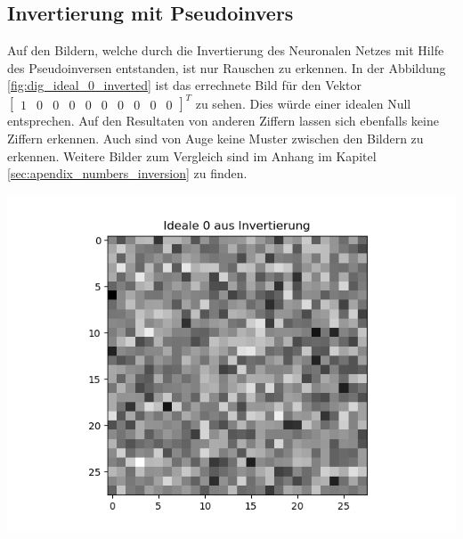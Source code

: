 \documentclass[Interploate_hadwritten_Digits.tex]{subfiles}
\begin{document}
	\subsection{Invertierung mit Pseudoinvers}
	Auf den Bildern, welche durch die Invertierung des Neuronalen Netzes mit Hilfe des Pseudoinversen entstanden, ist nur Rauschen zu erkennen. In der Abbildung \ref{fig:dig_ideal_0_inverted} ist das errechnete Bild für den Vektor $ \begin{bmatrix}1 & 0 & 0 & 0 & 0 & 0 & 0 & 0 & 0 & 0 \end{bmatrix}^{T} $ zu sehen. Dies würde einer idealen Null entsprechen. Auf den Resultaten von anderen Ziffern lassen sich ebenfalls keine Ziffern erkennen. Auch sind von Auge keine Muster zwischen den Bildern zu erkennen. Weitere Bilder zum Vergleich sind im Anhang im Kapitel \ref{sec:apendix_numbers_inversion} zu finden.
	\begin{Figure}
		\centering
		\includegraphics[width=\linewidth]{img/results/ideal_0_inverted.png}
		\label{fig:dig_ideal_0_inverted}
	\end{Figure}
\end{document}
